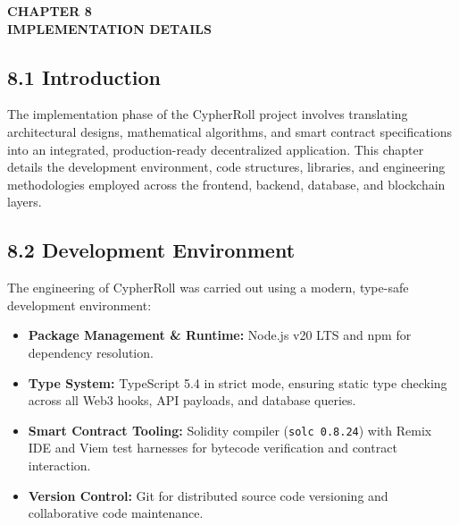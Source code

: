\vspace*{0.5cm}
\begin{center}
\textbf{CHAPTER 8}\\[0.15cm]
\textbf{IMPLEMENTATION DETAILS}
\end{center}
\label{chap:implementation}
\vspace{0.2cm}

\subsection*{8.1 Introduction}
The implementation phase of the CypherRoll project involves translating architectural designs, mathematical algorithms, and smart contract specifications into an integrated, production-ready decentralized application. This chapter details the development environment, code structures, libraries, and engineering methodologies employed across the frontend, backend, database, and blockchain layers.

\subsection*{8.2 Development Environment}
The engineering of CypherRoll was carried out using a modern, type-safe development environment:
\begin{itemize}[leftmargin=1.5em]
    \item \textbf{Package Management \& Runtime:} Node.js v20 LTS and npm for dependency resolution.
    \item \textbf{Type System:} TypeScript 5.4 in strict mode, ensuring static type checking across all Web3 hooks, API payloads, and database queries.
    \item \textbf{Smart Contract Tooling:} Solidity compiler (\texttt{solc 0.8.24}) with Remix IDE and Viem test harnesses for bytecode verification and contract interaction.
    \item \textbf{Version Control:} Git for distributed source code versioning and collaborative code maintenance.
\end{itemize}

